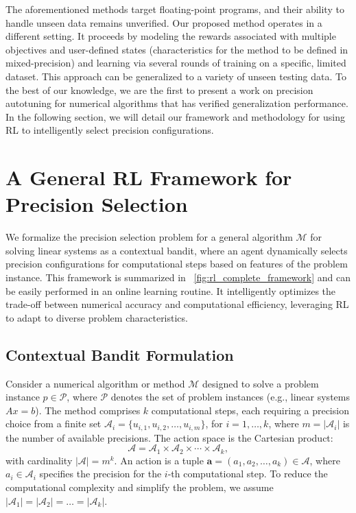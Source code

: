 \documentclass[Afour,sageh,times]{sagej}
\theoremstyle{plain}
\theoremstyle{definition}
\begin{document}
The aforementioned methods target floating-point programs, and their ability to handle unseen data remains unverified. Our proposed method operates in a different setting. It proceeds by modeling the rewards associated with multiple objectives and user-defined states (characteristics for the method to be defined in mixed-precision) and learning via several rounds of training on a specific, limited dataset. This approach can be generalized to a variety of unseen testing data. To the best of our knowledge, we are the first to present a work on precision autotuning for numerical algorithms that has verified generalization performance. In the following section, we will detail our framework and methodology for using RL to intelligently select precision configurations.


\section{A General RL Framework for Precision Selection}
\label{sec:general_framework}

We formalize the precision selection problem for a general algorithm $\mathcal{M}$ for solving linear systems as a contextual bandit, where an agent dynamically selects precision configurations for computational steps based on features of the problem instance. This framework is summarized in \figurename~\ref{fig:rl_complete_framework} and can be easily performed in an online learning routine. It intelligently optimizes the trade-off between numerical accuracy and computational efficiency, leveraging RL to adapt to diverse problem characteristics.
\subsection{Contextual Bandit Formulation}
\label{subsec:bandit_formulation}
Consider a numerical algorithm or method $\mathcal{M}$ designed to solve a problem instance $p \in \mathcal{P}$, where $\mathcal{P}$ denotes the set of problem instances (e.g., linear systems $Ax = b$). The method comprises $k$ computational steps, each requiring a precision choice from a finite set $\mathcal{A}_i = \{ u_{i,1}, u_{i,2}, \ldots, u_{i,m} \}$, for $i = 1, \ldots, k$, where $m = |\mathcal{A}_i|$ is the number of available precisions. The action space is the Cartesian product:
\begin{equation}
\mathcal{A} = \mathcal{A}_1 \times \mathcal{A}_2 \times \cdots \times \mathcal{A}_k,
\end{equation}
with cardinality $|\mathcal{A}| = m^k$. An action is a tuple $\mathbf{a} = (a_1, a_2, \ldots, a_k) \in \mathcal{A}$, where $a_i \in \mathcal{A}_i$ specifies the precision for the $i$-th computational step. To reduce the computational complexity and simplify the problem, we assume  $|\mathcal{A}_1|=|\mathcal{A}_2|=\ldots=|\mathcal{A}_k|$.
\end{document}

